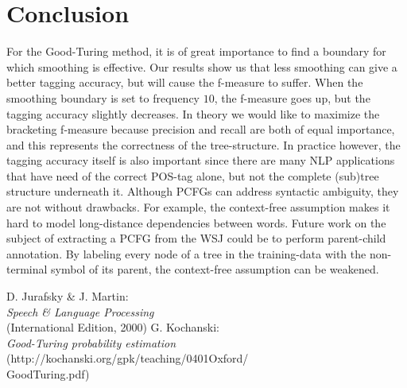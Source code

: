\documentclass[11pt,twocolumn]{article}
\newcommand{\tit}{\textit}
\begin{document}
	\section{Conclusion}\label{sec:conclusion}
		For the Good-Turing method, it is of great importance to find a boundary for which
		smoothing is effective. Our results show us that less smoothing can give a better
		tagging accuracy, but will cause the f-measure to suffer. When the smoothing boundary
		is set to frequency $10$, the f-measure goes up, but the tagging accuracy slightly
		decreases. In theory we would like to maximize the bracketing f-measure because
		precision and recall are both of equal importance, and this represents the correctness
		of the tree-structure. In practice however, the tagging accuracy itself is also
		important since there are many NLP applications that have need of the correct
		POS-tag alone, but not the complete (sub)tree structure underneath it. Although
		PCFGs can address syntactic ambiguity, they are not without drawbacks. For example,
		the context-free assumption makes it hard to model long-distance dependencies between
		words. Future work on the subject of extracting a PCFG from the WSJ could be to perform
		parent-child annotation. By labeling every node of a tree in the training-data with the
		non-terminal symbol of its parent, the context-free assumption can be weakened.

	\begin{thebibliography}{2}
			D. Jurafsky \& J. Martin:\\
			\tit{Speech \& Language Processing}\\
			(International Edition, 2000)
			G. Kochanski:\\
			\tit{Good-Turing probability estimation}\\
			(http://kochanski.org/gpk/teaching/0401Oxford/\\GoodTuring.pdf)
	\end{thebibliography}
\end{document}
